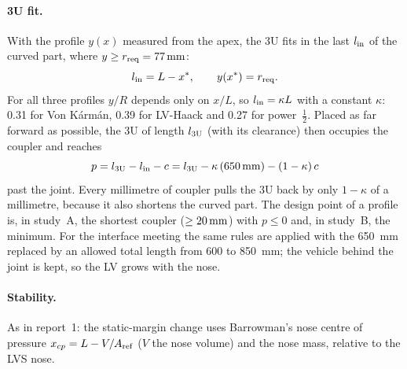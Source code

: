 \paragraph{3U fit.} With the profile $y(x)$ measured from the apex, the 3U fits in the last
$l_{\rm in}$ of the curved part, where $y \geq r_{\rm req} = \SI{77}{mm}$:
\begin{equation}
l_{\rm in} = L - x^{*}, \qquad y(x^{*}) = r_{\rm req}.
\label{eq:lin}
\end{equation}
For all three profiles $y/R$ depends only on $x/L$, so $l_{\rm in} = \kappa L$ with a constant
$\kappa$: 0.31 for Von K\'arm\'an, 0.39 for LV-Haack and 0.27 for power~$\tfrac12$. Placed as far
forward as possible, the 3U of length $l_{\rm 3U}$ (with its clearance) then occupies the coupler
and reaches
\begin{equation}
p = l_{\rm 3U} - l_{\rm in} - c = l_{\rm 3U} - \kappa\,(\SI{650}{mm}) - (1-\kappa)\,c
\label{eq:p}
\end{equation}
past the joint. Every millimetre of coupler pulls the 3U back by only $1-\kappa$ of a millimetre,
because it also shortens the curved part. The design point of a profile is, in study~A, the
shortest coupler ($\geq\SI{20}{mm}$) with $p\leq0$ and, in study~B, the \TLCMIN{} minimum. For the
interface meeting the same rules are applied with the \SI{650}{mm} replaced by an allowed total length
from 600 to \SI{850}{mm}; the vehicle behind the joint is kept, so the LV grows with the nose.

\paragraph{Stability.} As in report~1: the static-margin change uses Barrowman's nose centre of
pressure $x_{cp} = L - V/A_{\rm ref}$ ($V$ the nose volume) and the nose mass, relative to the LVS
nose.
